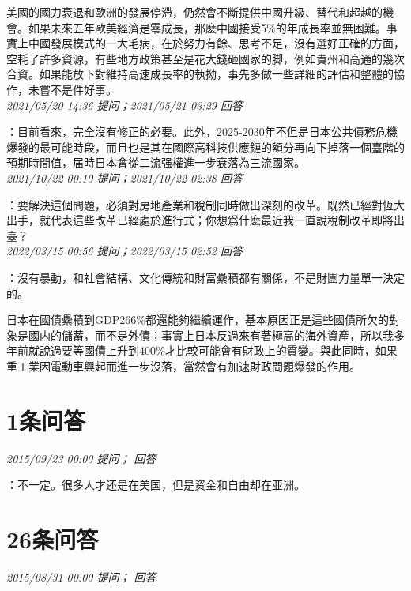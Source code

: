 \documentclass[twocolumn]{ctexart}
\begin{document}
美國的國力衰退和歐洲的發展停滯，仍然會不斷提供中國升級、替代和超越的機會。如果未來五年歐美經濟是零成長，那麽中國接受5\%的年成長率並無困難。事實上中國發展模式的一大毛病，在於努力有餘、思考不足，沒有選好正確的方面，空耗了許多資源，有些地方政策甚至是花大錢砸國家的脚，例如貴州和高通的幾次合資。如果能放下對維持高速成長率的執拗，事先多做一些詳細的評估和整體的協作，未嘗不是件好事。
\\

\textit{\hfill\noindent\small 2021/05/20 14:36 提问；2021/05/21 03:29 回答}

：目前看來，完全沒有修正的必要。此外，2025-2030年不但是日本公共債務危機爆發的最可能時段，而且也是其在國際高科技供應鏈的額分再向下掉落一個臺階的預期時間值，届時日本會從二流强權進一步衰落為三流國家。
\\

\textit{\hfill\noindent\small 2021/10/22 00:10 提问；2021/10/22 02:38 回答}

：要解決這個問題，必須對房地產業和稅制同時做出深刻的改革。既然已經對恆大出手，就代表這些改革已經處於進行式；你想爲什麽最近我一直說稅制改革即將出臺？
\\

\textit{\hfill\noindent\small 2022/03/15 00:56 提问；2022/03/15 02:52 回答}

：沒有暴動，和社會結構、文化傳統和財富纍積都有關係，不是財團力量單一決定的。

日本在國債纍積到GDP266\%都還能夠繼續運作，基本原因正是這些國債所欠的對象是國内的儲蓄，而不是外債；事實上日本反過來有著極高的海外資產，所以我多年前就說過要等國債上升到400\%才比較可能會有財政上的質變。與此同時，如果重工業因電動車興起而進一步沒落，當然會有加速財政問題爆發的作用。
\\

\section{1条问答}

\textit{\hfill\noindent\small 2015/09/23 00:00 提问； 回答}

：不一定。很多人才还是在美国，但是资金和自由却在亚洲。\\

\section{26条问答}

\textit{\hfill\noindent\small 2015/08/31 00:00 提问； 回答}
\end{document}
